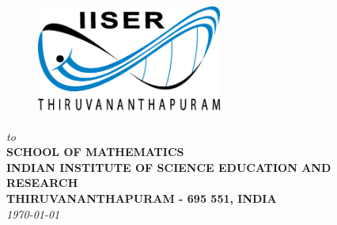 \begin{titlepage}
\begin{center}
\vfill

\begin{figure}[h]
  \begin{center}
  \includegraphics[height=36mm]{Images/Logos/iiser_logo.png}
  \end{center}
\end{figure}
\vspace*{0.2cm}

{\em\large to }\\%
{\bf\large SCHOOL OF MATHEMATICS} \\%
{\bf\large INDIAN INSTITUTE OF SCIENCE EDUCATION AND RESEARCH}\\%
{\bf\large THIRUVANANTHAPURAM - 695 551, INDIA}\\%
{\it\large \today}

\end{center}

\end{titlepage}

\clearpage

